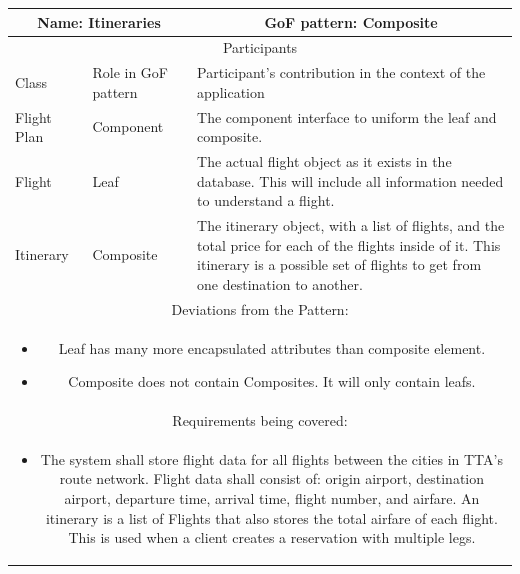 \begin{center}
    \begin{tabular}{ |p{4cm}|p{4cm}|p{7cm}|  }
        \hline
        \multicolumn{2}{|c|}{Name: Itineraries} & \multicolumn{1}{|c|}{GoF pattern: Composite} \\
        \hline
        \multicolumn{3}{|c|}{Participants} \\
        \hline
        Class & Role in GoF pattern & Participant's contribution in the context of the application \\
        \hline \hline
        Flight Plan & Component & The component interface to uniform the leaf and composite. \\
        \hline
        Flight & Leaf & The actual flight object as it exists in the database.
        This will include all information needed to understand a flight. \\
        \hline
        Itinerary & Composite & The itinerary object, with a list of flights, and the total price for each of the flights inside of it.
        This itinerary is a possible set of flights to get from one destination to another. \\
        \hline
        \hline
        \multicolumn{3}{|c|}{Deviations from the Pattern:} \\ \multicolumn{3}{|c|}{\parbox{0.9\textwidth}{
        \begin{itemize}
            \item Leaf has many more encapsulated attributes than composite element.
            \item Composite does not contain Composites. It will only contain leafs.
        \end{itemize} }} \\
        \hline
        \multicolumn{3}{|c|}{Requirements being covered:} \\ \multicolumn{3}{|c|}{\parbox{0.9\textwidth}{
        \begin{itemize}
            \item The system shall store flight data for all flights between the cities in TTA's route network.
            Flight data shall consist of: origin airport, destination airport, departure time, arrival time, flight number, and airfare.
            An itinerary is a list of Flights that also stores the total airfare of each flight.
            This is used when a client creates a reservation with multiple legs.
        \end{itemize} }} \\
        \hline
    \end{tabular}
\end{center}

